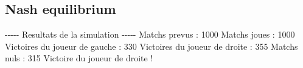 \documentclass{article}%
\begin{document}
%
\subsection{Nash equilibrium}%
\label{subsec:Nash equilibrium}%
{-}{-}{-}{-}{-} Resultats de la simulation {-}{-}{-}{-}{-}\newline%
		\newline%
Matchs prevus : 1000\newline%
Matchs joues : 1000\newline%
\newline%
Victoires du joueur de gauche : 330\newline%
Victoires du joueur de droite : 355\newline%
Matchs nuls : 315\newline%
\newline%
Victoire du joueur de droite !

%
\end{document}

